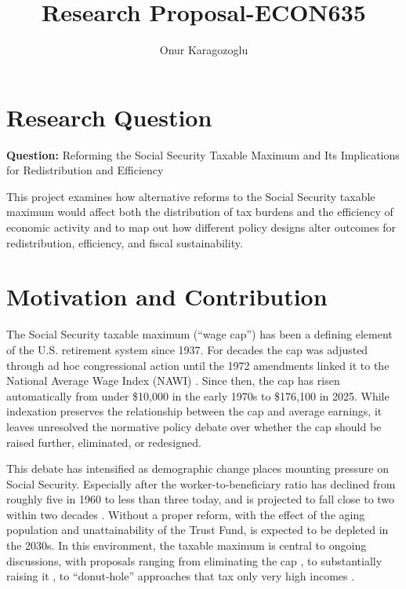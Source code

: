 

\title{Research Proposal-ECON635}
\author{Onur Karagozoglu}
\date{}



\maketitle

\section*{Research Question}

\textbf{Question:} Reforming the Social Security Taxable Maximum and Its Implications for Redistribution and Efficiency

This project examines how alternative reforms to the Social Security taxable maximum would affect both the distribution of tax burdens and the efficiency of economic activity and to map out how different policy designs alter outcomes for redistribution, efficiency, and fiscal sustainability.  

\section*{Motivation and Contribution}

The Social Security taxable maximum (``wage cap'') has been a defining element of the U.S. retirement system since 1937. For decades the cap was adjusted through ad hoc congressional action until the 1972 amendments linked it to the National Average Wage Index (NAWI) \citep{SSA2024}. Since then, the cap has risen automatically from under \$10{,}000 in the early 1970s to \$176{,}100 in 2025. While indexation preserves the relationship between the cap and average earnings, it leaves unresolved the normative policy debate over whether the cap should be raised further, eliminated, or redesigned.  

This debate has intensified as demographic change places mounting pressure on Social Security. Especially after the worker-to-beneficiary ratio has declined from roughly five in 1960 to less than three today, and is projected to fall close to two within two decades \citep{SSATrustees2024}. Without a proper reform, with the effect of the aging population and unattainability of the Trust Fund, is expected to be depleted in the 2030s. In this environment, the taxable maximum is central to ongoing discussions, with proposals ranging from eliminating the cap \citep{CRS2021}, to substantially raising it \citep{PGPF2025}, to ``donut-hole'' approaches that tax only very high incomes \citep{CBO2015}.  

